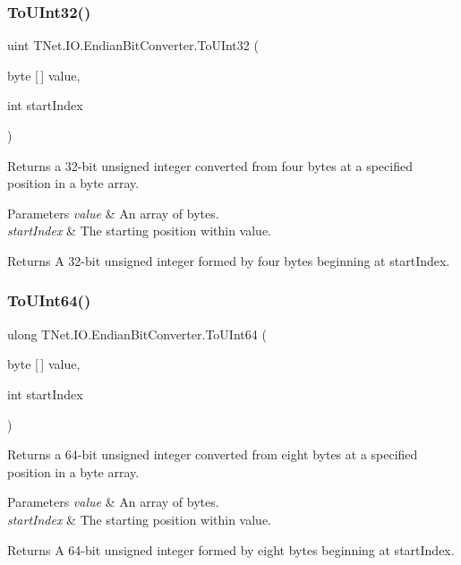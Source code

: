 \subsubsection{\texorpdfstring{To\+U\+Int32()}{ToUInt32()}}
{\footnotesize\ttfamily uint T\+Net.\+I\+O.\+Endian\+Bit\+Converter.\+To\+U\+Int32 (\begin{DoxyParamCaption}\item[{byte \mbox{[}$\,$\mbox{]}}]{value,  }\item[{int}]{start\+Index }\end{DoxyParamCaption})}



Returns a 32-\/bit unsigned integer converted from four bytes at a specified position in a byte array. 


\begin{DoxyParams}{Parameters}
{\em value} & An array of bytes.\\
\hline
{\em start\+Index} & The starting position within value.\\
\hline
\end{DoxyParams}
\begin{DoxyReturn}{Returns}
A 32-\/bit unsigned integer formed by four bytes beginning at start\+Index.
\end{DoxyReturn}
\mbox{\label{class_t_net_1_1_i_o_1_1_endian_bit_converter_aa693b9f9c3b71a8bb02730f1cd00b42f}} 
\subsubsection{\texorpdfstring{To\+U\+Int64()}{ToUInt64()}}
{\footnotesize\ttfamily ulong T\+Net.\+I\+O.\+Endian\+Bit\+Converter.\+To\+U\+Int64 (\begin{DoxyParamCaption}\item[{byte \mbox{[}$\,$\mbox{]}}]{value,  }\item[{int}]{start\+Index }\end{DoxyParamCaption})}



Returns a 64-\/bit unsigned integer converted from eight bytes at a specified position in a byte array. 


\begin{DoxyParams}{Parameters}
{\em value} & An array of bytes.\\
\hline
{\em start\+Index} & The starting position within value.\\
\hline
\end{DoxyParams}
\begin{DoxyReturn}{Returns}
A 64-\/bit unsigned integer formed by eight bytes beginning at start\+Index.
\end{DoxyReturn}


